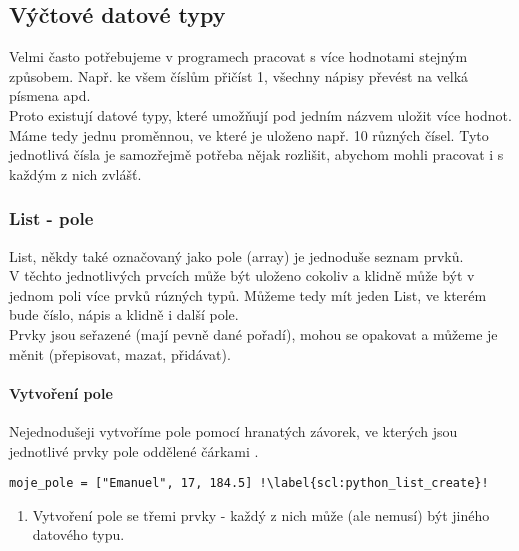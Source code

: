 \subsection{Výčtové datové typy}
Velmi často potřebujeme v programech pracovat s více hodnotami stejným způsobem. Např. ke všem číslům přičíst 1, všechny nápisy převést na velká písmena apd.\\
Proto existují datové typy, které umožňují pod jedním názvem uložit více hodnot. Máme tedy jednu proměnnou, ve které je uloženo např. 10 různých čísel. Tyto jednotlivá čísla je samozřejmě potřeba nějak rozlišit, abychom mohli pracovat i s každým z nich zvlášť.

\subsubsection{List - pole} \label{sec:list}
List, někdy také označovaný jako pole (array) je jednoduše seznam prvků.\\
V těchto jednotlivých prvcích může být uloženo cokoliv a klidně může být v jednom poli více prvků rúzných typů. Můžeme tedy mít jeden List, ve kterém bude číslo, nápis a klidně i další pole.\\
Prvky jsou seřazené (mají pevně dané pořadí), mohou se opakovat a můžeme je měnit (přepisovat, mazat, přidávat).

\paragraph{Vytvoření pole}
Nejednodušeji vytvoříme pole pomocí hranatých závorek, ve kterých jsou jednotlivé prvky pole oddělené čárkami .\\

\begin{minipage}[t]{.45\textwidth}
\begin{code}
\begin{verbatim}
moje_pole = ["Emanuel", 17, 184.5] !\label{scl:python_list_create}!
\end{verbatim}

\label{code:typy_list}
\end{code}
\end{minipage}
\begin{minipage}[t]{.45\textwidth}
\begin{enumerate}
\item[ř. \ref{scl:python_list_create}:] Vytvoření pole se třemi prvky - každý z nich může (ale nemusí) být jiného datového typu.
\end{enumerate}
\end{minipage}\\ 


